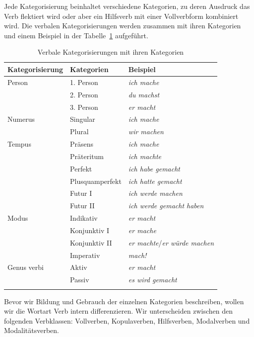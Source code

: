 Jede Kategorisierung beinhaltet verschiedene Kategorien, zu deren Ausdruck das Verb flektiert wird oder aber ein Hilfsverb mit einer Vollverbform kombiniert wird. Die verbalen Kategorisierungen werden zusammen mit ihren Kategorien und einem Beispiel in der Tabelle~\ref{tab:V_Kategorisierung_Kategorien} aufgeführt.

\begin{table}
  \centering
  \begin{tabularx}{\textwidth}{Xll}
    \lsptoprule
    Kategorisierung & Kategorien & Beispiel \\
    \hline
    Person & 1. Person & \textit{ich mache} \\
    & 2. Person & \textit{du machst} \\
    & 3. Person & \textit{er macht} \\
    Numerus & Singular & \textit{ich mache} \\
    & Plural & \textit{wir machen}\\
    Tempus & Präsens & \textit{ich mache} \\
    & Präteritum & \textit{ich machte}\\
    & Perfekt & \textit{ich habe gemacht} \\
    & Plusquamperfekt & \textit{ich hatte gemacht} \\
    & Futur I & \textit{ich werde machen} \\
    & Futur II & \textit{ich werde gemacht haben}\\
    Modus & Indikativ & \textit{er macht} \\ 
    & Konjunktiv I & \textit{er mache}\\
    & Konjunktiv II & \textit{er machte}/\textit{er würde machen}\\
    & Imperativ & \textit{mach!}\\
    Genus verbi & Aktiv & \textit{er macht}\\
    & Passiv & \textit{es wird gemacht} \\ 
    \lspbottomrule 
  \end{tabularx}
  \caption{Verbale Kategorisierungen mit ihren Kategorien}
  \label{tab:V_Kategorisierung_Kategorien}
\end{table}

Bevor wir Bildung und Gebrauch der einzelnen Kategorien beschreiben, wollen wir die Wortart Verb intern differenzieren. Wir unterscheiden zwischen den folgenden Verbklassen: Vollverben, Kopulaverben, Hilfsverben, Modalverben und Modalitätsverben. 

